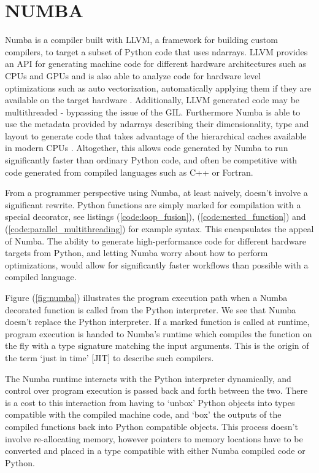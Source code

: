 \documentclass{IEEEcsmag}
\begin{document}
\section{NUMBA}

Numba is a compiler built with LLVM, a framework for building custom compilers, to target a subset of Python code that uses ndarrays. LLVM provides an API for generating machine code for different hardware architectures such as CPUs and GPUs and is also able to analyze code for hardware level optimizations such as auto vectorization, automatically applying them if they are available on the target hardware \cite{Lattner2004}. Additionally, LLVM generated code may be multithreaded - bypassing the issue of the GIL. Furthermore Numba is able to use the metadata provided by ndarrays describing their dimensionality, type and layout to generate code that takes advantage of the hierarchical caches available in modern CPUs \cite{Lam2015}. Altogether, this allows code generated by Numba to run significantly faster than ordinary Python code, and often be competitive with code generated from compiled languages such as C++ or Fortran. 

From a programmer perspective using Numba, at least naively, doesn't involve a significant rewrite. Python functions are simply marked for compilation with a special decorator, see listings (\ref{code:loop_fusion}), (\ref{code:nested_function}) and (\ref{code:parallel_multithreading}) for example syntax. This encapsulates the appeal of Numba. The ability to generate high-performance code for different hardware targets from Python, and letting Numba worry about how to perform optimizations, would allow for significantly faster workflows than possible with a compiled language.

Figure (\ref{fig:numba}) illustrates the program execution path when a Numba decorated function is called from the Python interpreter. We see that Numba doesn't replace the Python interpreter. If a marked function is called at runtime, program execution is handed to Numba's runtime which compiles the function on the fly with a type signature matching the input arguments. This is the origin of the term `just in time' [JIT] to describe such compilers.

The Numba runtime interacts with the Python interpreter dynamically, and control over program execution is passed back and forth between the two. There is a cost to this interaction from having to `unbox' Python objects into types compatible with the compiled machine code, and `box' the outputs of the compiled functions back into Python compatible objects. This process doesn't involve re-allocating memory, however pointers to memory locations have to be converted and placed in a type compatible with either Numba compiled code or Python.
\end{document}
